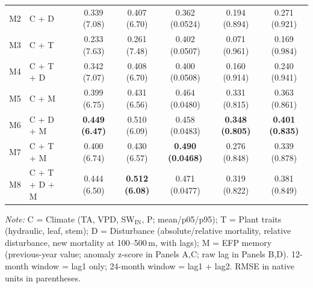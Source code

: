 \begin{table}[htbp]
\begin{tabular}{llcccccc}
M2 & C + D &  & 0.339 (7.08) & 0.407 (6.70) & 0.362 (0.0524) & 0.194 (0.894) & 0.271 (0.921) \\
M3 & C + T &  & 0.233 (7.63) & 0.261 (7.48) & 0.402 (0.0507) & 0.071 (0.961) & 0.169 (0.984) \\
M4 & C + T + D &  & 0.342 (7.07) & 0.408 (6.70) & 0.400 (0.0508) & 0.160 (0.914) & 0.240 (0.941) \\
M5 & C + M &  & 0.399 (6.75) & 0.431 (6.56) & 0.464 (0.0480) & 0.331 (0.815) & 0.363 (0.861) \\
M6 & C + D + M &  & \textbf{0.449 (6.47)} & 0.510 (6.09) & 0.458 (0.0483) & \textbf{0.348 (0.805)} & \textbf{0.401 (0.835)} \\
M7 & C + T + M &  & 0.400 (6.74) & 0.430 (6.57) & \textbf{0.490 (0.0468)} & 0.276 (0.848) & 0.339 (0.878) \\
M8 & C + T + D + M &  & 0.444 (6.50) & \textbf{0.512 (6.08)} & 0.471 (0.0477) & 0.319 (0.822) & 0.381 (0.849) \\
\midrule
\bottomrule
\end{tabular}
\vspace{2pt}
\begin{minipage}{\linewidth}
\footnotesize
\textit{Note:} C = Climate (TA, VPD, SW$_\mathrm{IN}$, P; mean/p05/p95); T = Plant traits (hydraulic, leaf, stem); D = Disturbance (absolute/relative mortality, relative disturbance, new mortality at 100--500\,m, with lags); M = EFP memory (previous-year value; anomaly z-score in Panels A,C; raw lag in Panels B,D). 12-month window = lag1 only; 24-month window = lag1 + lag2. RMSE in native units in parentheses.
\end{minipage}
\end{table}

